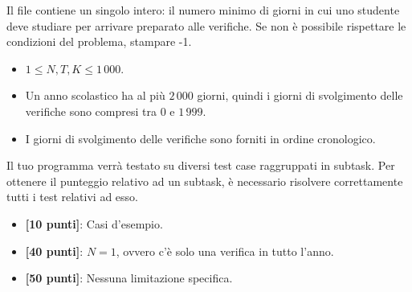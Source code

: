 \Output
Il file \outputfile{} contiene un singolo intero: il numero minimo di giorni in cui uno studente deve studiare per arrivare preparato alle verifiche. Se non è possibile rispettare le condizioni del problema, stampare -1.

\pagebreak

\Constraints
\begin{itemize}[nolistsep, itemsep=2mm]
\item $1 \le N, T, K \le 1\,000$.
\item Un anno scolastico ha al più $2\,000$ giorni, quindi i giorni di svolgimento delle verifiche sono compresi tra 0 e $1\,999$.
\item I giorni di svolgimento delle verifiche sono forniti in ordine cronologico.
\end{itemize}
\Scoring
Il tuo programma verrà testato su diversi test case raggruppati in subtask.
Per ottenere il punteggio relativo ad un subtask, è necessario risolvere
correttamente tutti i test relativi ad esso.
\begin{itemize}[nolistsep,itemsep=2mm]
\item \textbf{ [10 punti]}: Casi d'esempio.
\item \textbf{ [40 punti]}: $N = 1$, ovvero c'è solo una verifica in tutto l'anno.
\item \textbf{ [50 punti]}: Nessuna limitazione specifica.
\end{itemize}

\Examples
\begin{example}
%
%
\end{example}
